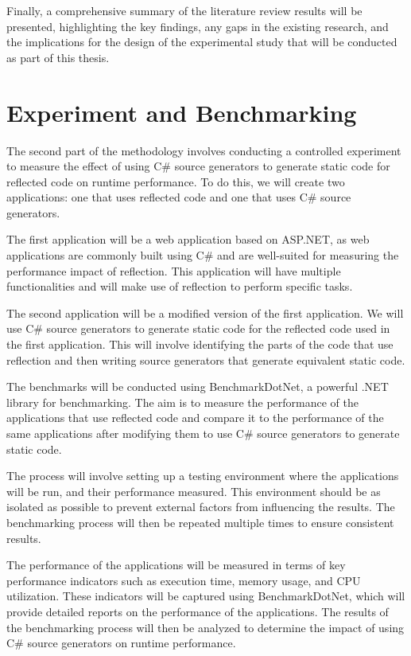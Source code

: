 Finally, a comprehensive summary of the literature review results will be presented, highlighting the key findings, any gaps in the existing research, and the implications for the design of the experimental study that will be conducted as part of this thesis.


\section{Experiment and Benchmarking}

The second part of the methodology involves conducting a controlled experiment to measure the effect of using C\# source generators to generate static code for reflected code on runtime performance. To do this, we will create two applications: one that uses reflected code and one that uses C\# source generators.

The first application will be a web application based on ASP.NET, as web applications are commonly built using C\# and are well-suited for measuring the performance impact of reflection. This application will have multiple functionalities and will make use of reflection to perform specific tasks.

The second application will be a modified version of the first application. We will use C\# source generators to generate static code for the reflected code used in the first application. This will involve identifying the parts of the code that use reflection and then writing source generators that generate equivalent static code.

The benchmarks will be conducted using BenchmarkDotNet, a powerful .NET library for benchmarking. The aim is to measure the performance of the applications that use reflected code and compare it to the performance of the same applications after modifying them to use C\# source generators to generate static code.

The process will involve setting up a testing environment where the applications will be run, and their performance measured. This environment should be as isolated as possible to prevent external factors from influencing the results. The benchmarking process will then be repeated multiple times to ensure consistent results.

The performance of the applications will be measured in terms of key performance indicators such as execution time, memory usage, and CPU utilization. These indicators will be captured using BenchmarkDotNet, which will provide detailed reports on the performance of the applications. The results of the benchmarking process will then be analyzed to determine the impact of using C\# source generators on runtime performance.

